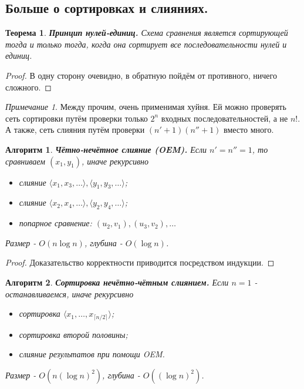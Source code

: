 \documentclass[a4paper]{article}
\theoremstyle{indented}
\newtheorem{theorem}{Теорема}
\newtheorem{alg}{Алгоритм}
\theoremstyle{definition}
\theoremstyle{remark}
\newtheorem{remark}{Примечание}
\begin{document}
\subsection{Больше о сортировках и слияниях.}

\begin{theorem}
    \textbf{Принцип нулей-единиц.} Схема сравнения является сортирующей тогда и только тогда, когда она сортирует все последовательности нулей и единиц.
\end{theorem}

\begin{proof}
    В одну сторону очевидно, в обратную пойдём от противного, ничего сложного.
\end{proof}

\begin{remark}
    Между прочим, очень применимая хуйня. Ей можно проверять сеть сортировки путём проверки только $2^n$ входных последовательностей, а не $n!$. А также, сеть слияния путём проверки $(n'+1)(n''+1)$ вместо много.
\end{remark}

\begin{alg}
    \textbf{Чётно-нечётное слияние (OEM).} Если $n'=n''=1$, то сравниваем $(x_1, y_1)$, иначе рекурсивно

    \begin{itemize}
        \item слияние $\langle x_1, x_3, \ldots \rangle , \langle y_1, y_3, \ldots \rangle$; 
        \item слияние $\langle x_2, x_4, \ldots \rangle , \langle y_2, y_4, \ldots \rangle$;
        \item попарное сравнение: $(u_2, v_1), (u_3, v_2), \ldots$
    \end{itemize}

    Размер - $O(n\log n)$, глубина - $O(\log n)$. 
\end{alg}

\begin{proof}
    Доказательство корректности приводится посредством индукции.
\end{proof}

\begin{alg}
    \textbf{Сортировка нечётно-чётным слиянием.} Если $n=1$ - останавливаемся, иначе рекурсивно

    \begin{itemize}
        \item сортировка $\langle x_1, \ldots, x_{\lceil n/2 \rceil} \rangle$; 
        \item сортировка второй половины; 
        \item слияние результатов при помощи OEM.
    \end{itemize}

    Размер - $O(n(\log n)^2)$, глубина - $O((\log n)^2)$.
\end{alg}
\end{document}
